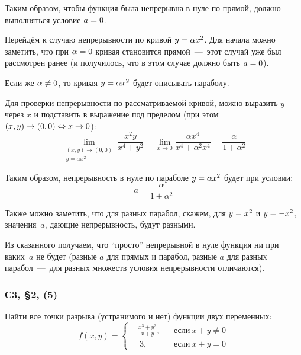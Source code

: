 \documentclass[a4paper,12pt]{article}
\begin{document}
\begin{solution}
    Таким образом, чтобы функция была непрерывна в нуле по прямой, должно выполняться условие $a \hm= 0$.

    \medskip

    Перейдём к случаю непрерывности по кривой $y \hm= \alpha x^2$.
    Для начала можно заметить, что при $\alpha \hm= 0$ кривая становится прямой~---~этот случай уже был рассмотрен ранее (и получилось, что в этом случае должно быть $a \hm= 0$).

    Если же $\alpha \hm{\not=} 0$, то кривая $y \hm= \alpha x^2$ будет описывать параболу.

    Для проверки непрерывности по рассматриваемой кривой, можно выразить $y$ через $x$ и подставить в выражение под пределом (при этом $(x, y) \hm\to (0, 0) \hm\Leftrightarrow x \hm\to 0$):
    \[
      \lim_{\substack{(x, y) \to (0, 0) \\ y = \alpha x^2}} \frac{x^2 y}{x^4 + y^2}
        = \lim_{x \to 0} \frac{\alpha x^4}{x^4 + \alpha^2 x^4} = \frac{\alpha}{1 + \alpha^2}
    \]

    Таким образом, непрерывность в нуле по параболе $y \hm= \alpha x^2$ будет при условии:
    \[
      a = \frac{\alpha}{1 + \alpha^2}
    \]

    Также можно заметить, что для разных парабол, скажем, для $y \hm= x^2$ и $y \hm= -x^2$, значения~$a$, дающие непрерывность, будут разными.

    \medskip

    Из сказанного получаем, что ``просто'' непрерывной в нуле функция ни при каких~$a$ не будет (разные $a$ для прямых и парабол, разные $a$ для разных парабол~---~для разных множеств условия непрерывности отличаются).
    
  \end{solution}

  
  \subsubsection{С3, \S 2, (5)}

  Найти все точки разрыва (устранимого и нет) функции двух переменных:
  \[
    f(x, y) = \left\{
      \begin{aligned}
        &\frac{x^3 + y^3}{x + y}, & &\mbox{если}\ x + y \not= 0\\
        &\ 3,                     & &\mbox{если}\ x + y = 0
      \end{aligned}
    \right.
  \]
  
\end{document}
